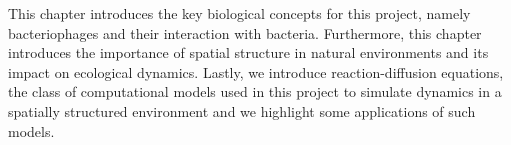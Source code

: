 




This chapter introduces the key biological concepts for this project, namely bacteriophages and their interaction with bacteria. Furthermore, this chapter introduces the importance of spatial structure in natural environments and its impact on ecological dynamics. Lastly, we introduce reaction-diffusion equations, the class of computational models used in this project to simulate dynamics in a spatially structured environment and we highlight some applications of such models.

